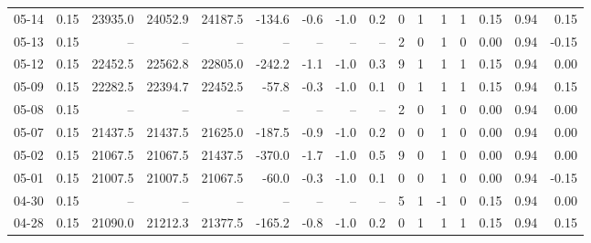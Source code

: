 \begin{threeparttable}
{\begin{tabular}{lrrrrrrrrrrrrrrr}
  05-14 &     0.15 & 23935.0 & 24052.9 & 24187.5 &     -134.6 &           -0.6 &                     -1.0 &                 0.2 &              0 &         1 &     1 &         1 &       0.15 &      0.94 &           0.15 \\
  05-13 &     0.15 &      -- &      -- &      -- &         -- &             -- &                       -- &                  -- &              2 &         0 &     1 &         0 &       0.00 &      0.94 &          -0.15 \\
  05-12 &     0.15 & 22452.5 & 22562.8 & 22805.0 &     -242.2 &           -1.1 &                     -1.0 &                 0.3 &              9 &         1 &     1 &         1 &       0.15 &      0.94 &           0.00 \\
  05-09 &     0.15 & 22282.5 & 22394.7 & 22452.5 &      -57.8 &           -0.3 &                     -1.0 &                 0.1 &              0 &         1 &     1 &         1 &       0.15 &      0.94 &           0.15 \\
  05-08 &     0.15 &      -- &      -- &      -- &         -- &             -- &                       -- &                  -- &              2 &         0 &     1 &         0 &       0.00 &      0.94 &           0.00 \\
  05-07 &     0.15 & 21437.5 & 21437.5 & 21625.0 &     -187.5 &           -0.9 &                     -1.0 &                 0.2 &              0 &         0 &     1 &         0 &       0.00 &      0.94 &           0.00 \\
  05-02 &     0.15 & 21067.5 & 21067.5 & 21437.5 &     -370.0 &           -1.7 &                     -1.0 &                 0.5 &              9 &         0 &     1 &         0 &       0.00 &      0.94 &           0.00 \\
  05-01 &     0.15 & 21007.5 & 21007.5 & 21067.5 &      -60.0 &           -0.3 &                     -1.0 &                 0.1 &              0 &         0 &     1 &         0 &       0.00 &      0.94 &          -0.15 \\
  04-30 &     0.15 &      -- &      -- &      -- &         -- &             -- &                       -- &                  -- &              5 &         1 &    -1 &         0 &       0.15 &      0.94 &           0.00 \\
  04-28 &     0.15 & 21090.0 & 21212.3 & 21377.5 &     -165.2 &           -0.8 &                     -1.0 &                 0.2 &              0 &         1 &     1 &         1 &       0.15 &      0.94 &           0.15 \\

\end{tabular}}
\end{threeparttable}
